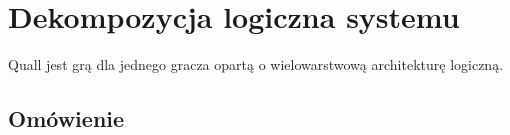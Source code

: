 \documentclass[12pt,a4paper,twoside]{article}
\begin{document}


\section{Dekompozycja logiczna systemu}


Quall jest grą dla jednego gracza opartą o wielowarstwową architekturę logiczną. 

\subsection{Omówienie}
\end{document}
